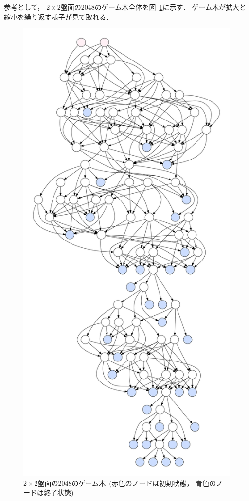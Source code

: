 参考として， $2\times2$盤面の2048のゲーム木全体を図~\ref{fig:game_tree}に示す．
ゲーム木が拡大と縮小を繰り返す様子が見て取れる．
\begin{figure}[H]
    \centering
    \includegraphics[width=0.7\linewidth{}]{figures/tree.pdf}
    \caption{$2\times2$盤面の2048のゲーム木~(赤色のノードは初期状態， 青色のノードは終了状態)}
    \label{fig:game_tree}
\end{figure}